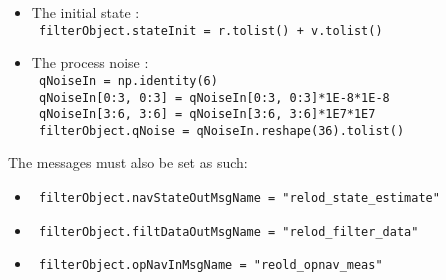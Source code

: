 \begin{itemize}
{                              0.0, 0.0, 0.0, 0.0, 0.0, 5.*1E6]}
 \item The initial state :\\
  \texttt{      filterObject.stateInit = r.tolist() + v.tolist()} 
    \item The process noise :\\
  \texttt{     qNoiseIn = np.identity(6)} \\
  \texttt{     qNoiseIn[0:3, 0:3] = qNoiseIn[0:3, 0:3]*1E-8*1E-8} \\
  \texttt{     qNoiseIn[3:6, 3:6] = qNoiseIn[3:6, 3:6]*1E7*1E7} \\
  \texttt{     filterObject.qNoise = qNoiseIn.reshape(36).tolist()}
\end{itemize}

The messages must also be set as such:

\begin{itemize}
\item    \texttt{    filterObject.navStateOutMsgName = "relod\_state\_estimate"}
 \item    \texttt{   filterObject.filtDataOutMsgName = "relod\_filter\_data"}
 \item    \texttt{   filterObject.opNavInMsgName = "reold\_opnav\_meas"}
\end{itemize}

